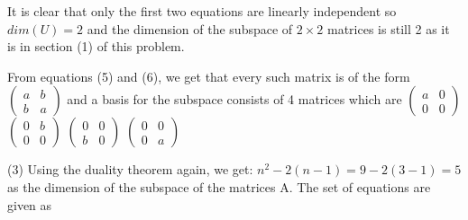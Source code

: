 \documentclass[12pt]{article}
\begin{document}
It is clear that only the first two equations are linearly independent so $dim(U)=2$ and the dimension of the subspace of $2 \times 2$ matrices is still 2 as it is in section (1) of this problem.

From equations (5) and (6), we get that every such matrix is of the form $\begin{pmatrix}
a & b \\ b& a
\end{pmatrix}$ and a basis for the subspace consists of 4 matrices which are $\begin{pmatrix}
a & 0 \\ 0& 0
\end{pmatrix}$ $\begin{pmatrix}
0 & b \\ 0& 0
\end{pmatrix}$
$\begin{pmatrix}
0 & 0 \\ b& 0
\end{pmatrix}$
$\begin{pmatrix}
0 & 0 \\ 0& a
\end{pmatrix}$



\medskip
(3)
Using the duality theorem again, we get: $n^2 - 2(n -1) = 9 - 2(3 -1) = 5$ as the dimension of the subspace of the matrices A. The set of equations are given as 
\end{document}
